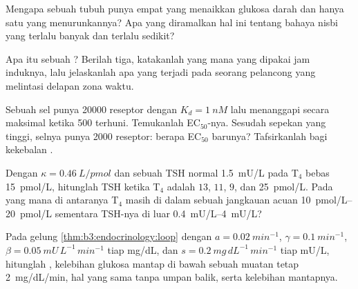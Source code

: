 \begin{exercise}[$\star$]\label{exo:b3:endocrinology:3}
Mengapa sebuah tubuh punya empat  yang menaikkan glukosa darah dan hanya
satu yang menurunkannya? Apa yang diramalkan hal ini tentang bahaya nisbi
 yang terlalu banyak dan terlalu sedikit?
\end{exercise}

\begin{exercise}[$\star$]\label{exo:b3:endocrinology:4}
Apa itu sebuah ? Berilah tiga, katakanlah yang mana yang dipakai jam induknya, lalu
jelaskanlah apa yang terjadi pada seorang pelancong yang melintasi delapan zona waktu.
\end{exercise}

\begin{exercise}[$\star\star$]\label{exo:b3:endocrinology:5}
Sebuah sel punya \num{20000} reseptor dengan $K_{d} = \qty{1}{nM}$ lalu menanggapi
secara maksimal ketika \num{500} terhuni. Temukanlah EC$_{50}$-nya. Sesudah sepekan
 yang tinggi, selnya punya \num{2000} reseptor: berapa EC$_{50}$ barunya?
Tafsirkanlah bagi kekebalan .
\end{exercise}

\begin{exercise}[$\star\star$]\label{exo:b3:endocrinology:6}
Dengan $\kappa = \qty{0.46}{L/pmol}$ dan sebuah TSH normal \qty{1.5}{mU/L}
pada T$_{4}$ bebas \qty{15}{pmol/L}, hitunglah TSH ketika T$_{4}$ adalah $13$,
$11$, $9$, dan \qty{25}{pmol/L}. Pada yang mana di antaranya T$_{4}$ masih
di dalam sebuah jangkauan acuan \qtyrange{10}{20}{pmol/L} sementara TSH-nya
di luar \qtyrange{0.4}{4}{mU/L}?
\end{exercise}

\begin{exercise}[$\star\star$]\label{exo:b3:endocrinology:7}
Pada gelung \cref{thm:b3:endocrinology:loop} dengan $a = \qty{0.02}{min^{-1}}$,
$\gamma = \qty{0.1}{min^{-1}}$, $\beta = \qty{0.05}{mU\,L^{-1}\,min^{-1}}$
tiap mg/dL, dan $s = \qty{0.2}{mg\,dL^{-1}\,min^{-1}}$ tiap mU/L, hitunglah
, kelebihan glukosa mantap di bawah sebuah muatan tetap
\qty{2}{mg/dL/min}, hal yang sama tanpa umpan balik, serta kelebihan 
mantapnya.
\end{exercise}

